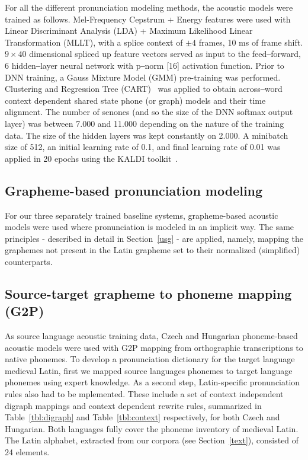 \documentclass[runningheads,a4paper]{llncs}
\begin{document}
For all the different pronunciation modeling methods, the acoustic models were trained as follows.
Mel-Frequency Cepstrum $+$ Energy features were used with Linear Discriminant Analysis (LDA) + Maximum Likelihood Linear Transformation (MLLT), with a splice context of $\pm4$ frames, 10 ms of frame shift.
$9\times40$ dimensional spliced up feature vectors served as input to the feed‒forward, 6 hidden‒layer neural network with p‒norm [16] activation function.
Prior to DNN training, a Gauss Mixture Model (GMM) pre-training was performed.
Clustering and Regression Tree (CART)~\cite{kaldi} was applied to obtain across‒word context dependent shared state phone (or graph) models and their time alignment.
The number of senones (and so the size of the DNN softmax output layer) was between 7.000 and 11.000 depending on the nature of the training data.
The size of the hidden layers was kept constantly on 2.000.
A minibatch size of 512, an initial learning rate of 0.1, and final learning rate of 0.01 was applied in 20 epochs using the KALDI toolkit~\cite{kaldi}.
\subsection{Grapheme-based pronunciation modeling}\label{baseline}
For our three separately trained baseline systems, grapheme-based acoustic models were used where pronunciation is modeled in an implicit way.
The same principles - described in detail in Section~\ref{usg} - are applied, namely, mapping the graphemes not present in the Latin grapheme set to their normalized (simplified) counterparts.
\subsection{Source-target grapheme to phoneme mapping (G2P)}\label{g2p}
As source language acoustic training data, Czech and Hungarian phoneme-based acoustic models were used with G2P mapping from orthographic transcriptions to native phonemes.
To develop a pronunciation dictionary for the target language medieval Latin, first we mapped source languages phonemes to target language phonemes using expert knowledge.
As a second step, Latin-specific pronunciation rules also had to be mplemented.
These include a set of context independent digraph mappings and context dependent rewrite rules, summarized in Table~\ref{tbl:digraph} and Table~\ref{tbl:context} respectively, for both Czech and Hungarian.
Both languages fully cover the phoneme inventory of medieval Latin.
The Latin alphabet, extracted from our corpora (see Section~\ref{text}), consisted of 24 elements.
\end{document}
